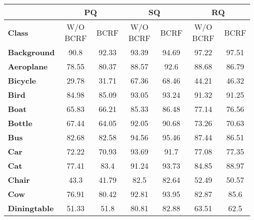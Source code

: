 \begin{table*}[t]
	\vspace{-0.2cm}
	\hspace{0.2cm}
	\centering
	{\arraybackslash
\begin{tabular}{l|c|c|c|c|c|c}
	\hline
	\textbf{}	         & \multicolumn{2}{c|}{\textbf{PQ}} & \multicolumn{2}{c|}{\textbf{SQ}} & \multicolumn{2}{c}{\textbf{RQ}}  \\ \hline
	\textbf{Class}       & W/O BCRF       & BCRF            & W/O BCRF        & BCRF           & W/O BCRF        & BCRF           \\ \hline
	\textbf{Background}  & 90.8           & 92.33           & 93.39           & 94.69          & 97.22           & 97.51          \\ \hline
	\textbf{Aeroplane}   & 78.55          & 80.37           & 88.57           & 92.6           & 88.68           & 86.79          \\ \hline
	\textbf{Bicycle}     & 29.78          & 31.71           & 67.36           & 68.46          & 44.21           & 46.32          \\ \hline
	\textbf{Bird}        & 84.98          & 85.09           & 93.05           & 93.24          & 91.32           & 91.25          \\ \hline
	\textbf{Boat}        & 65.83          & 66.21           & 85.33           & 86.48          & 77.14           & 76.56          \\ \hline
	\textbf{Bottle}      & 67.44          & 64.05           & 92.05           & 90.68          & 73.26           & 70.63          \\ \hline
	\textbf{Bus}         & 82.68          & 82.58           & 94.56           & 95.46          & 87.44           & 86.51          \\ \hline
	\textbf{Car}         & 72.22          & 70.93           & 93.69           & 91.7           & 77.08           & 77.35          \\ \hline
	\textbf{Cat}         & 77.41          & 83.4            & 91.24           & 93.73          & 84.85           & 88.97          \\ \hline
	\textbf{Chair}       & 43.3           & 41.79           & 82.5            & 82.64          & 52.49           & 50.57          \\ \hline
	\textbf{Cow}         & 76.91          & 80.42           & 92.81           & 93.95          & 82.87           & 85.6           \\ \hline
	\textbf{Diningtable} & 51.33          & 51.8            & 80.81           & 82.88          & 63.51           & 62.5           \\ \hline

\end{tabular}}
\end{table*}
